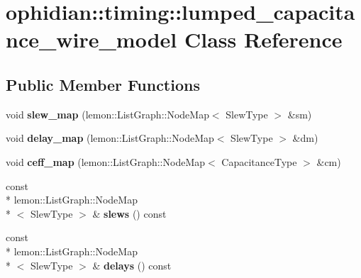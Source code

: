 \hypertarget{classophidian_1_1timing_1_1lumped__capacitance__wire__model}{\section{ophidian\-:\-:timing\-:\-:lumped\-\_\-capacitance\-\_\-wire\-\_\-model Class Reference}
\label{classophidian_1_1timing_1_1lumped__capacitance__wire__model}
}
\subsection*{Public Member Functions}
\begin{DoxyCompactItemize}
\item 
\hypertarget{classophidian_1_1timing_1_1lumped__capacitance__wire__model_abadbeeba23bac75604d76622f17f40bd}{void {\bfseries slew\-\_\-map} (lemon\-::\-List\-Graph\-::\-Node\-Map$<$ Slew\-Type $>$ \&sm)}\label{classophidian_1_1timing_1_1lumped__capacitance__wire__model_abadbeeba23bac75604d76622f17f40bd}

\item 
\hypertarget{classophidian_1_1timing_1_1lumped__capacitance__wire__model_a96c7aeb18c446e80cbcf69b3eff2ce42}{void {\bfseries delay\-\_\-map} (lemon\-::\-List\-Graph\-::\-Node\-Map$<$ Slew\-Type $>$ \&dm)}\label{classophidian_1_1timing_1_1lumped__capacitance__wire__model_a96c7aeb18c446e80cbcf69b3eff2ce42}

\item 
\hypertarget{classophidian_1_1timing_1_1lumped__capacitance__wire__model_a60395dcd8fe90026bee99fb3168653ec}{void {\bfseries ceff\-\_\-map} (lemon\-::\-List\-Graph\-::\-Node\-Map$<$ Capacitance\-Type $>$ \&cm)}\label{classophidian_1_1timing_1_1lumped__capacitance__wire__model_a60395dcd8fe90026bee99fb3168653ec}

\item 
\hypertarget{classophidian_1_1timing_1_1lumped__capacitance__wire__model_aec46559a8fc42bbbf7a02b592f65bb42}{const \\*
lemon\-::\-List\-Graph\-::\-Node\-Map\\*
$<$ Slew\-Type $>$ \& {\bfseries slews} () const }\label{classophidian_1_1timing_1_1lumped__capacitance__wire__model_aec46559a8fc42bbbf7a02b592f65bb42}

\item 
\hypertarget{classophidian_1_1timing_1_1lumped__capacitance__wire__model_ab367b8bb45c21206c143f28a3aaecd1c}{const \\*
lemon\-::\-List\-Graph\-::\-Node\-Map\\*
$<$ Slew\-Type $>$ \& {\bfseries delays} () const }\label{classophidian_1_1timing_1_1lumped__capacitance__wire__model_ab367b8bb45c21206c143f28a3aaecd1c}


\end{DoxyCompactItemize}
